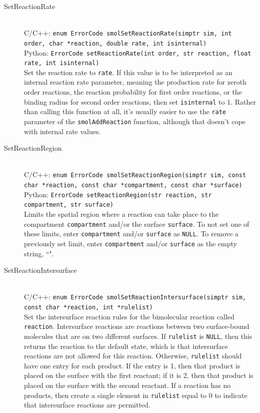 \documentclass {book}
\newcommand {\ttt} {\texttt}
\begin{document}
\begin{description}
\item[SetReactionRate]
\hfill \\
C/C++: \ttt{enum ErrorCode smolSetReactionRate(simptr sim, int order, char *reaction, double rate, int isinternal)}\\
Python: \ttt{ErrorCode setReactionRate(int order, str reaction, float rate, int isinternal)}\\
Set the reaction rate to \ttt{rate}. If this value is to be interpreted as an internal reaction rate parameter, meaning the production rate for zeroth order reactions, the reaction probability for first order reactions, or the binding radius for second order reactions, then set \ttt{isinternal} to 1. Rather than calling this function at all, it's usually easier to use the \ttt{rate} parameter of the \ttt{smolAddReaction} function, although that doesn't cope with internal rate values.

\item[SetReactionRegion]
\hfill \\
C/C++: \ttt{enum ErrorCode smolSetReactionRegion(simptr sim, const char *reaction, const char *compartment, const char *surface)}\\
Python: \ttt{ErrorCode setReactionRegion(str reaction, str compartment, str surface)}\\
Limits the spatial region where a reaction can take place to the compartment \ttt{compartment} and/or the surface \ttt{surface}. To not set one of these limits, enter \ttt{compartment} and/or \ttt{surface} as \ttt{NULL}. To remove a previously set limit, enter \ttt{compartment} and/or \ttt{surface} as the empty string, ``".

\item[SetReactionIntersurface]
\hfill \\
C/C++: \ttt{enum ErrorCode smolSetReactionIntersurface(simptr sim, const char *reaction, int *rulelist)}\\
Set the intersurface reaction rules for the bimolecular reaction called \ttt{reaction}. Intersurface reactions are reactions between two surface-bound molecules that are on two different surfaces. If \ttt{rulelist} is \ttt{NULL}, then this returns the reaction to the default state, which is that intersurface reactions are not allowed for this reaction. Otherwise, \ttt{rulelist} should have one entry for each product. If the entry is 1, then that product is placed on the surface with the first reactant; if it is 2, then that product is placed on the surface with the second reactant. If a reaction has no products, then create a single element in \ttt{rulelist} equal to 0 to indicate that intersurface reactions are permitted.


\end{description}
\end{document}
